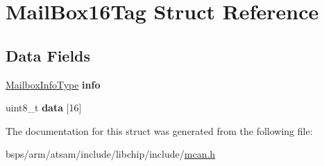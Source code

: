 \hypertarget{structMailBox16Tag}{}\section{Mail\+Box16\+Tag Struct Reference}
\label{structMailBox16Tag}
\subsection*{Data Fields}
\begin{DoxyCompactItemize}
\item 
\mbox{\label{structMailBox16Tag_a03ded3e88645c35e3231d9fa4fae8b18}} 
\mbox{\hyperlink{structMailboxInfoTag}{Mailbox\+Info\+Type}} {\bfseries info}
\item 
\mbox{\label{structMailBox16Tag_a5ad7389580ca026e251e599106750f46}} 
uint8\+\_\+t {\bfseries data} \mbox{[}16\mbox{]}
\end{DoxyCompactItemize}


The documentation for this struct was generated from the following file\+:\begin{DoxyCompactItemize}
\item 
bsps/arm/atsam/include/libchip/include/\mbox{\hyperlink{mcan_8h}{mcan.\+h}}\end{DoxyCompactItemize}
